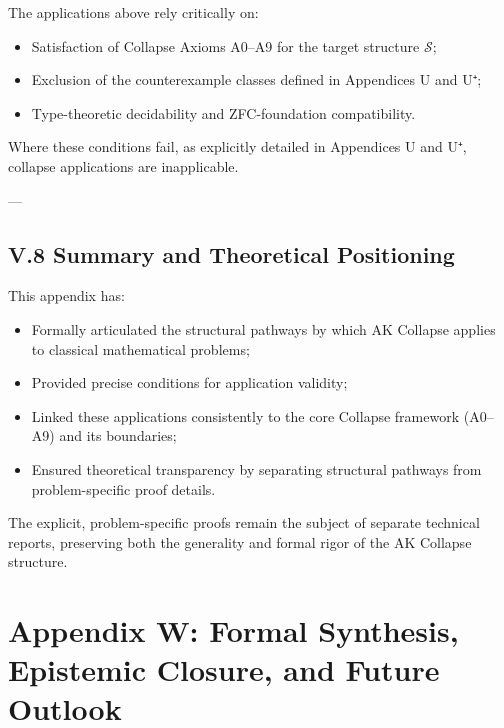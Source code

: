 \documentclass[11pt]{article}
\begin{document}
The applications above rely critically on:

\begin{itemize}
    \item Satisfaction of Collapse Axioms A0–A9 for the target structure $\mathcal{S}$;
    \item Exclusion of the counterexample classes defined in Appendices U and U⁺;
    \item Type-theoretic decidability and ZFC-foundation compatibility.
\end{itemize}

Where these conditions fail, as explicitly detailed in Appendices U and U⁺, collapse applications are inapplicable.

---

\subsection*{V.8 Summary and Theoretical Positioning}

This appendix has:

\begin{itemize}
    \item Formally articulated the structural pathways by which AK Collapse applies to classical mathematical problems;
    \item Provided precise conditions for application validity;
    \item Linked these applications consistently to the core Collapse framework (A0–A9) and its boundaries;
    \item Ensured theoretical transparency by separating structural pathways from problem-specific proof details.
\end{itemize}

The explicit, problem-specific proofs remain the subject of separate technical reports, preserving both the generality and formal rigor of the AK Collapse structure.




\section*{Appendix W: Formal Synthesis, Epistemic Closure, and Future Outlook}
\end{document}
